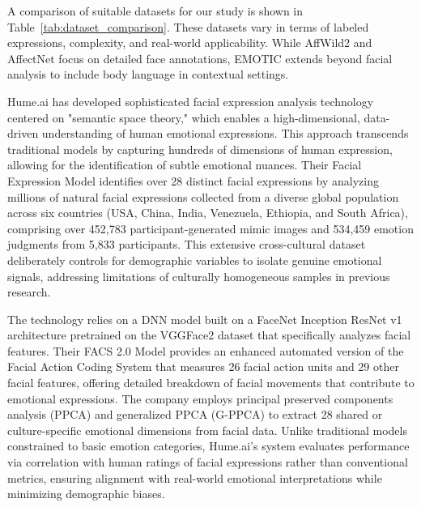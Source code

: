 \par A comparison of suitable datasets for our study is shown in Table~\ref{tab:dataset_comparison}.
These datasets vary in terms of labeled expressions, complexity, and real-world applicability. While AffWild2 and AffectNet focus on detailed face annotations, EMOTIC extends beyond facial analysis to include body language in contextual settings.

\par Hume.ai has developed sophisticated facial expression analysis technology centered on "semantic space theory,"\citep{cowen2021semantic} which enables a high-dimensional, data-driven understanding of human emotional expressions. This approach transcends traditional models by capturing hundreds of dimensions of human expression, allowing for the identification of subtle emotional nuances. Their Facial Expression Model identifies over 28 distinct facial expressions by analyzing millions of natural facial expressions collected from a diverse global population across six countries (USA, China, India, Venezuela, Ethiopia, and South Africa), comprising over 452,783 participant-generated mimic images and 534,459 emotion judgments from 5,833 participants. This extensive cross-cultural dataset deliberately controls for demographic variables to isolate genuine emotional signals, addressing limitations of culturally homogeneous samples in previous research.\citep{brooks2024deep}

\par The technology relies on a DNN model built on a FaceNet Inception ResNet v1 architecture pretrained on the VGGFace2 dataset that specifically analyzes facial features. Their FACS 2.0 Model provides an enhanced automated version of the Facial Action Coding System that measures 26 facial action units and 29 other facial features, offering detailed breakdown of facial movements that contribute to emotional expressions. The company employs principal preserved components analysis (PPCA) and generalized PPCA (G-PPCA) to extract 28 shared or culture-specific emotional dimensions from facial data. Unlike traditional models constrained to basic emotion categories, Hume.ai's system evaluates performance via correlation with human ratings of facial expressions rather than conventional metrics, ensuring alignment with real-world emotional interpretations while minimizing demographic biases\citep{brooks2024deep}.

